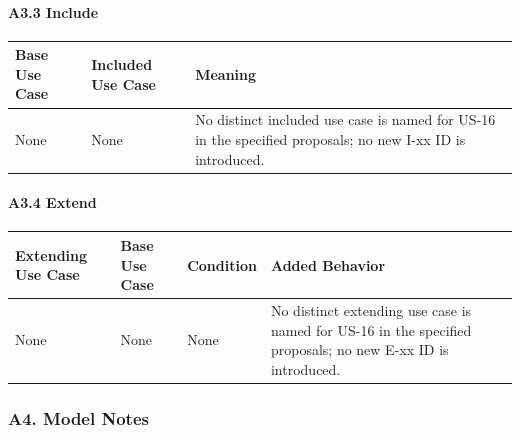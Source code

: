 \documentclass[12pt]{article}
\renewcommand{\baselinestretch}{1.5}
\begin{document}
\hypertarget{sec:a3-3-include}{}
\paragraph*{A3.3 Include}
\par\medskip

\begingroup
\small
\renewcommand{\baselinestretch}{1.0}\selectfont
\renewcommand{\arraystretch}{1.15}
\setlength{\tabcolsep}{6pt}
\begin{longtable}{|>{\raggedright\arraybackslash}p{}|>{\raggedright\arraybackslash}p{}|>{\raggedright\arraybackslash}p{}|}
\hline
\textbf{Base Use Case} & \textbf{Included Use Case} & \textbf{Meaning} \\ \hline
\endhead
None & None & No distinct included use case is named for US-16 in the specified proposals; no new I-xx ID is introduced. \\ \hline
\end{longtable}
\endgroup
\par\medskip

\hypertarget{sec:a3-4-extend}{}
\paragraph*{A3.4 Extend}
\par\medskip

\begingroup
\small
\renewcommand{\baselinestretch}{1.0}\selectfont
\renewcommand{\arraystretch}{1.15}
\setlength{\tabcolsep}{6pt}
\begin{longtable}{|>{\raggedright\arraybackslash}p{}|>{\raggedright\arraybackslash}p{}|>{\raggedright\arraybackslash}p{}|>{\raggedright\arraybackslash}p{}|}
\hline
\textbf{Extending Use Case} & \textbf{Base Use Case} & \textbf{Condition} & \textbf{Added Behavior} \\ \hline
\endhead
None & None & None & No distinct extending use case is named for US-16 in the specified proposals; no new E-xx ID is introduced. \\ \hline
\end{longtable}
\endgroup
\par\medskip

\hypertarget{sec:a4-model-notes}{}
\subsubsection*{A4. Model Notes}
\par\medskip
\end{document}
